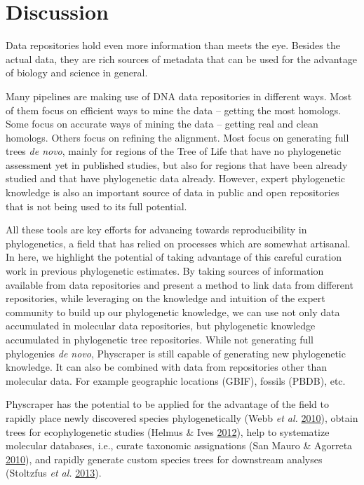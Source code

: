 \documentclass[]{article}
\begin{document}
\hypertarget{discussion}{%
\section{Discussion}\label{discussion}}

Data repositories hold even more information than meets the eye.
Besides the actual data, they are rich sources of metadata that can be used for the advantage of biology and science in general.

Many pipelines are making use of DNA data repositories in different ways.
Most of them focus on efficient ways to mine the data -- getting the most homologs.
Some focus on accurate ways of mining the data -- getting real and clean homologs.
Others focus on refining the alignment.
Most focus on generating full trees \emph{de novo}, mainly for regions of the Tree of
Life that have no phylogenetic assessment yet in published studies, but also for
regions that have been already studied and that have phylogenetic data already.
However, expert phylogenetic knowledge is also an important source of data in public
and open repositories that is not being used to its full potential.

All these tools are key efforts for advancing towards reproducibility in phylogenetics,
a field that has relied on processes which are somewhat artisanal.
In here, we highlight the potential of taking advantage of this careful curation work in previous phylogenetic estimates. By taking sources of information available from data repositories and present a method to link data from different repositories, while leveraging on the knowledge and intuition of the expert
community to build up our phylogenetic knowledge, we can use not only data accumulated in
molecular data repositories, but phylogenetic knowledge accumulated in phylogenetic tree repositories.
While not generating full phylogenies \emph{de novo}, Physcraper is still capable of generating new phylogenetic knowledge.
It can also be combined with data from repositories other than molecular data. For example geographic locations (GBIF), fossils (PBDB), etc.

Physcraper has the potential to be applied for the advantage of the field to rapidly
place newly discovered species phylogenetically (Webb \emph{et al.} \protect\hyperlink{ref-webb2010biodiversity}{2010}),
obtain trees for ecophylogenetic studies (Helmus \& Ives \protect\hyperlink{ref-helmus2012phylogenetic}{2012}),
help to systematize molecular databases, i.e., curate taxonomic assignations (San Mauro \& Agorreta \protect\hyperlink{ref-san2010molecular}{2010}),
and rapidly generate custom species trees for downstream analyses (Stoltzfus \emph{et al.} \protect\hyperlink{ref-stoltzfus2013phylotastic}{2013}).
\end{document}
